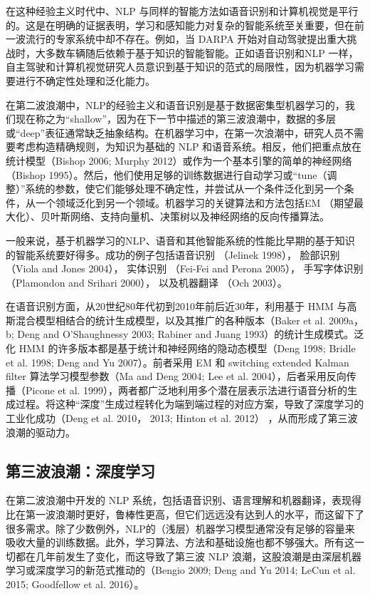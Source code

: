 在这种经验主义时代中、NLP
与同样的智能方法如语音识别和计算机视觉是平行的。这是在明确的证据表明，学习和感知能力对复杂的智能系统至关重要，但在前一波流行的专家系统中却不存在。例如，当
DARPA
开始对自动驾驶提出重大挑战时，大多数车辆随后依赖于基于知识的智能智能。正如语音识别和NLP
一样，自主驾驶和计算机视觉研究人员意识到基于知识的范式的局限性，因为机器学习需要进行不确定性处理和泛化能力。

在第二波浪潮中，NLP的经验主义和语音识别是基于数据密集型机器学习的，我们现在称之为``shallow''，因为在下一节中描述的第三波浪潮中，数据的多层或``deep''表征通常缺乏抽象结构。在机器学习中，在第一次浪潮中，研究人员不需要考虑构造精确规则，为知识为基础的
NLP 和语音系统。相反，他们把重点放在统计模型（Bishop 2006; Murphy
2012）或作为一个基本引擎的简单的神经网络（Bishop
1995）。然后，他们使用足够的训练数据进行自动学习或``tune（调整）''系统的参数，使它们能够处理不确定性，并尝试从一个条件泛化到另一个条件，从一个领域泛化到另一个领域。机器学习的关键算法和方法包括EM
（期望最大化）、贝叶斯网络、支持向量机、决策树以及神经网络的反向传播算法。

一般来说，基于机器学习的NLP、语音和其他智能系统的性能比早期的基于知识的智能系统要好得多。成功的例子包括语音识别
（Jelinek 1998）， 脸部识别 （Viola and Jones 2004）， 实体识别
（Fei-Fei and Perona 2005）， 手写字体识别 （Plamondon and Srihari
2000）， 以及机器翻译 （Och 2003）。

在语音识别方面，从20世纪80年代初到2010年前后近30年，利用基于 HMM
与高斯混合模型相结合的统计生成模型，以及其推广的各种版本（Baker et al.
2009a，b; Deng and O'Shaughnessy 2003; Rabiner and Juang
1993）的统计生成模式。泛化 HMM
的许多版本都是基于统计和神经网络的隐动态模型（Deng 1998; Bridle et al.
1998; Deng and Yu 2007）。前者采用 EM 和 switching extended Kalman ﬁlter
算法学习模型参数（Ma and Deng 2004; Lee et al.
2004），后者采用反向传播（Picone et al.
1999），两者都广泛地利用多个潜在层表示法进行语音分析的生成过程。将这种``深度''生成过程转化为端到端过程的对应方案，导致了深度学习的工业化成功（Deng
et al. 2010， 2013; Hinton et al. 2012）
，从而形成了第三波浪潮的驱动力。

\subsection{第三波浪潮：深度学习}\label{ux7b2cux4e09ux6ce2ux6d6aux6f6eux6df1ux5ea6ux5b66ux4e60}

在第二波浪潮中开发的 NLP
系统，包括语音识别、语言理解和机器翻译，表现得比在第一波浪潮时更好，鲁棒性更高，但它们远远没有达到人的水平，而这留下了很多需求。除了少数例外，NLP的（浅层）机器学习模型通常没有足够的容量来吸收大量的训练数据。此外，学习算法、方法和基础设施也都不够强大。所有这一切都在几年前发生了变化，而这导致了第三波
NLP 浪潮，这股浪潮是由深层机器学习或深度学习的新范式推动的（Bengio 2009;
Deng and Yu 2014; LeCun et al. 2015; Goodfellow et al. 2016）。


